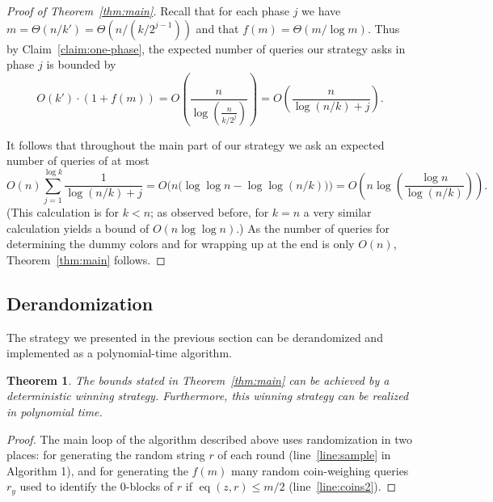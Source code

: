 \documentclass[english,a4paper,11pt]{article}
\DeclareMathOperator{\eq}{eq}
\newtheorem{theorem}{Theorem}
\begin{document}
{\begin{proof}[Proof of Theorem~\ref{thm:main}]
Recall that for each phase $j$ we have $m=\Theta(n/k')=\Theta(n/(k/2^{j-1}))$ and that $f(m)=\Theta(m/\log m)$. Thus by Claim~\ref{claim:one-phase}, the expected number of queries our strategy asks in phase $j$ is bounded by $$O(k')\cdot (1 + f(m)) = O\left(\frac{n}{\log(\frac{n}{k/2^j})}\right) = O\left( \frac{n}{\log(n/k) +j}\right).$$

It follows that throughout the main part of our strategy we ask an expected number of queries of at most 
$$O(n) \sum_{j=1}^{\log k} \frac{1}{\log(n/k) +j} = O\big(n \big(\log \log n - \log\log (n/k)\big)\big)= O\left(n \log \left(\frac{\log n}{\log (n/k)}\right)\right).
$$
(This calculation is for $k<n$; as observed before, for $k=n$ a very similar calculation yields a bound of $O(n\log\log n)$.)
As the number of queries for determining the dummy colors and for wrapping up at the end  is only $O(n)$, Theorem~\ref{thm:main} follows.
\end{proof}


\subsection{Derandomization}
\label{sec:derandomization}

The strategy we presented in the previous section can be derandomized and implemented as a polynomial-time algorithm.

\begin{theorem}
\label{thm:derandupper}
The bounds stated in Theorem~\ref{thm:main} can be achieved by a deterministic winning strategy. 
Furthermore, this winning strategy can be realized in polynomial time.
\end{theorem}

\begin{proof}
The main loop of the algorithm described above uses randomization in two places: for generating the random string $r$ of each round (line~\ref{line:sample} in Algorithm 1), and for generating the $f(m)$ many random coin-weighing queries $r_y$ used to identify the $0$-blocks of $r$ if $\eq(z,r)\leq m/2$ (line~\ref{line:coins2}).


\end{proof}}
\end{document}
